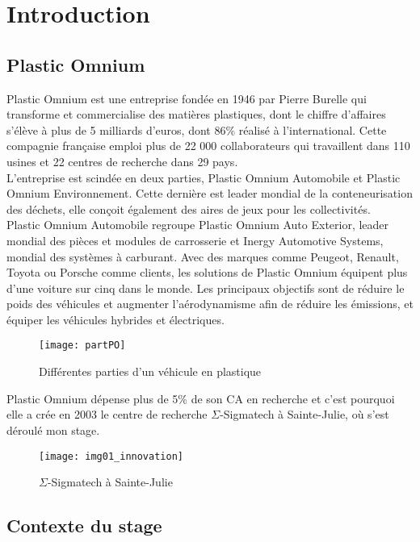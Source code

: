 \chapter{Introduction}
\section{Plastic Omnium}

Plastic Omnium est une entreprise fondée en 1946 par Pierre Burelle qui transforme et commercialise des matières plastiques, dont le chiffre d'affaires s'élève à plus de 5 milliards d'euros, dont 86\% réalisé à l'international. Cette compagnie française emploi plus de 22 000 collaborateurs qui travaillent dans 110 usines et 22 centres de recherche dans 29 pays.\\

L'entreprise est scindée en deux parties, Plastic Omnium Automobile et Plastic Omnium Environnement. Cette dernière est leader mondial de la conteneurisation des déchets, elle conçoit également des aires de jeux pour les collectivités.\\
Plastic Omnium Automobile regroupe Plastic Omnium Auto Exterior, leader mondial des pièces et modules de carrosserie et Inergy Automotive Systems,  mondial des systèmes à carburant. Avec des marques comme Peugeot, Renault, Toyota ou Porsche comme clients, les solutions de Plastic Omnium équipent plus d'une voiture sur cinq dans le monde. Les principaux objectifs sont de réduire le poids des véhicules et augmenter l'aérodynamisme afin de réduire les émissions, et équiper les véhicules hybrides et électriques. \\

\begin{figure}[H]
\centering
\texttt{[image: partPO]}
\caption{Différentes parties d'un véhicule en plastique}
\end{figure}

Plastic Omnium dépense plus de 5\% de son CA en recherche et c'est pourquoi elle a crée en 2003 le centre de recherche $\Sigma$-Sigmatech à Sainte-Julie, où s'est déroulé mon stage.\\

\begin{figure}[H]
\centering
\texttt{[image: img01\_innovation]}
\caption{$\Sigma$-Sigmatech à Sainte-Julie}
\end{figure}

\section{Contexte du stage}

